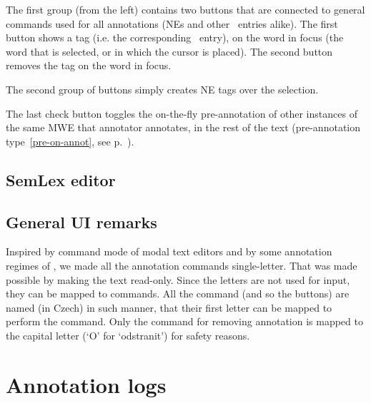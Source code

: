 The first group (from the left) contains two buttons that are connected to general commands used for all annotations (NEs and other \semlex\ entries alike). The first button shows a tag (i.e. the corresponding \semlex\ entry), on the word in focus (the word that is selected, or in which the cursor is placed). The second button removes the tag on the word in focus.

The second group of buttons simply creates NE tags over the selection. 

The last check button toggles the on-the-fly pre-annotation of other instances of the same MWE that annotator annotates, in the rest of the text (pre-annotation type~\ref{pre-on-annot}, see p.~\pageref{pre-on-annot}).



\subsection{SemLex editor}
\todo


\subsection{General UI remarks}
Inspired by command mode of modal text editors and by some annotation regimes of \tred, we made all the annotation commands single-letter. That was made possible by making the text read-only. Since the letters are not used for input, they can be mapped to commands. All the command (and so the buttons) are named (in Czech) in such manner, that their first letter can be mapped to perform the command. Only the command for removing annotation is mapped to the capital letter (`O' for `odstranit') for safety reasons.


\section{Annotation logs}
\label{sec:logs}
\todo


